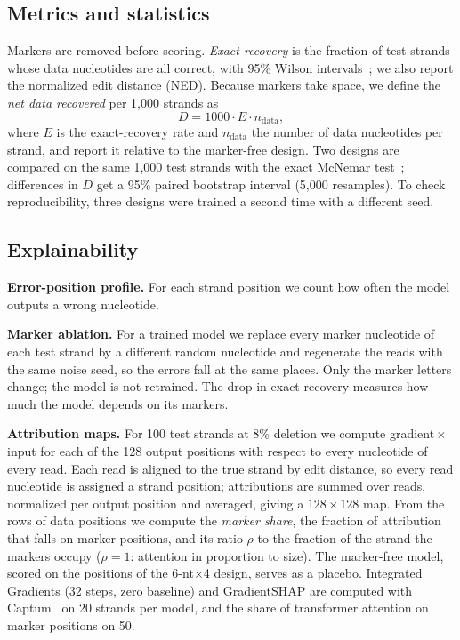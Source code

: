 \subsection{Metrics and statistics}
Markers are removed before scoring. \emph{Exact recovery} is the fraction of test strands whose data nucleotides are all
correct, with 95\% Wilson intervals~\cite{wilson1927}; we also report the normalized edit distance (NED). Because markers
take space, we define the \emph{net data recovered} per 1{,}000 strands as
\begin{equation}
  D = 1000 \cdot E \cdot n_{\mathrm{data}},
\end{equation}
where $E$ is the exact-recovery rate and $n_{\mathrm{data}}$ the number of data nucleotides per strand, and report it
relative to the marker-free design. Two designs are compared on the same 1{,}000 test strands with the exact McNemar
test~\cite{mcnemar1947}; differences in $D$ get a 95\% paired bootstrap interval (5{,}000 resamples). To check
reproducibility, three designs were trained a second time with a different seed.

\subsection{Explainability}
\textbf{Error-position profile.} For each strand position we count how often the model outputs a wrong nucleotide.

\textbf{Marker ablation.} For a trained model we replace every marker nucleotide of each test strand by a different random
nucleotide and regenerate the reads with the same noise seed, so the errors fall at the same places. Only the marker
letters change; the model is not retrained. The drop in exact recovery measures how much the model depends on its
markers.

\textbf{Attribution maps.} For 100 test strands at 8\% deletion we compute gradient\,$\times$\,input for each of the 128
output positions with respect to every nucleotide of every read. Each read is aligned to the true strand by edit
distance, so every read nucleotide is assigned a strand position; attributions are summed over reads, normalized per
output position and averaged, giving a $128\times128$ map. From the rows of data positions we compute the \emph{marker
share}, the fraction of attribution that falls on marker positions, and its ratio $\rho$ to the fraction of the strand the
markers occupy ($\rho=1$: attention in proportion to size). The marker-free model, scored on the positions of the
6-nt$\times$4 design, serves as a placebo. Integrated Gradients (32 steps, zero baseline) and GradientSHAP are computed with
Captum~\cite{kokhlikyan2020} on 20 strands per model, and the share of transformer attention on marker positions on 50.

